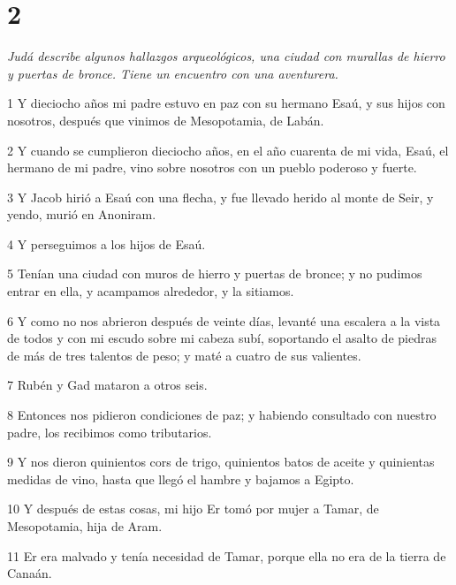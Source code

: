 \chapter{2}

\par \textit{Judá describe algunos hallazgos arqueológicos, una ciudad con murallas de hierro y puertas de bronce. Tiene un encuentro con una aventurera.}

\par 1 Y dieciocho años mi padre estuvo en paz con su hermano Esaú, y sus hijos con nosotros, después que vinimos de Mesopotamia, de Labán.

\par 2 Y cuando se cumplieron dieciocho años, en el año cuarenta de mi vida, Esaú, el hermano de mi padre, vino sobre nosotros con un pueblo poderoso y fuerte.

\par 3 Y Jacob hirió a Esaú con una flecha, y fue llevado herido al monte de Seir, y yendo, murió en Anoniram.

\par 4 Y perseguimos a los hijos de Esaú.

\par 5 Tenían una ciudad con muros de hierro y puertas de bronce; y no pudimos entrar en ella, y acampamos alrededor, y la sitiamos.

\par 6 Y como no nos abrieron después de veinte días, levanté una escalera a la vista de todos y con mi escudo sobre mi cabeza subí, soportando el asalto de piedras de más de tres talentos de peso; y maté a cuatro de sus valientes.

\par 7 Rubén y Gad mataron a otros seis.

\par 8 Entonces nos pidieron condiciones de paz; y habiendo consultado con nuestro padre, los recibimos como tributarios.

\par 9 Y nos dieron quinientos cors de trigo, quinientos batos de aceite y quinientas medidas de vino, hasta que llegó el hambre y bajamos a Egipto.

\par 10 Y después de estas cosas, mi hijo Er tomó por mujer a Tamar, de Mesopotamia, hija de Aram.

\par 11 Er era malvado y tenía necesidad de Tamar, porque ella no era de la tierra de Canaán.


